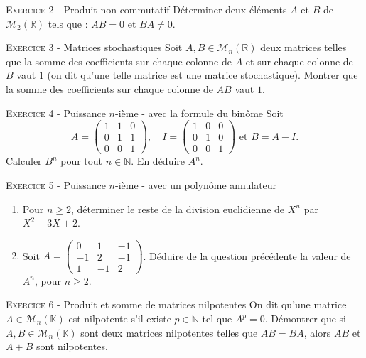 \vskip0.3cm\noindent\textsc{Exercice 2} - Produit non commutatif
\vskip0.2cm
Déterminer deux éléments $A$ et $B$ de
$\mathcal M_2({\mathbb R})$ tels que : $AB=0$ et $BA\not = 0$.




\vskip0.3cm\noindent\textsc{Exercice 3} - Matrices stochastiques
\vskip0.2cm
Soit $A,B\in\mathcal M_n(\mathbb R)$ deux matrices telles que la somme des coefficients sur chaque colonne de $A$ et sur chaque colonne de $B$ vaut $1$
(on dit qu'une telle matrice est une matrice stochastique).
Montrer que la somme des coefficients sur chaque colonne de $AB$ vaut $1$.




\vskip0.3cm\noindent\textsc{Exercice 4} - Puissance $n$-ième - avec la formule du binôme
\vskip0.2cm
Soit $$A=\left(
\begin{array}{ccc}
1&1&0\\
0&1&1\\
0&0&1
\end{array}\right),\quad
I=\left(
\begin{array}{ccc}
1&0&0\\
0&1&0\\
0&0&1
\end{array}\right)\textrm{ et }
B=A-I.$$
Calculer $B^n$ pour tout $n\in\mathbb N$. En déduire $A^n$.




\vskip0.3cm\noindent\textsc{Exercice 5} - Puissance $n$-ième - avec un polynôme annulateur
\vskip0.2cm
\begin{enumerate}
\item Pour $n\geq 2$, déterminer le reste de la division euclidienne de $X^n$ par $X^2-3X+2$.
\item Soit  $A=\begin{pmatrix} 
0&1&-1\\
-1&2&-1\\
1&-1&2
\end{pmatrix}$. Déduire de la question précédente la valeur de $A^n$, pour $n\geq 2$.
\end{enumerate}




\vskip0.3cm\noindent\textsc{Exercice 6} - Produit et somme de matrices nilpotentes
\vskip0.2cm
On dit qu'une matrice $A\in\mathcal M_n(\mathbb K)$ est nilpotente s'il existe $p\in\mathbb N$ tel que $A^p=0$. Démontrer que si $A,B\in\mathcal M_n(\mathbb K)$ sont deux matrices nilpotentes telles que $AB=BA$, alors $AB$ et $A+B$ sont nilpotentes.


